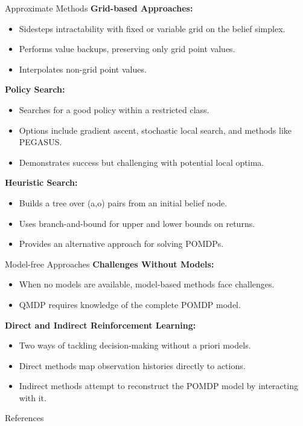 \documentclass[presentation, smaller]{beamer}
\begin{document}
\begin{frame}{Approximate Methods}
  \textbf{Grid-based Approaches:}
  \begin{itemize}
    \item Sidesteps intractability with fixed or variable grid on the belief simplex.
    \item Performs value backups, preserving only grid point values.
    \item Interpolates non-grid point values.
  \end{itemize}

  \textbf{Policy Search:}
  \begin{itemize}
    \item Searches for a good policy within a restricted class.
    \item Options include gradient ascent, stochastic local search, and methods like PEGASUS.
    \item Demonstrates success but challenging with potential local optima.
  \end{itemize}

  \textbf{Heuristic Search:}
  \begin{itemize}
    \item Builds a tree over (a,o) pairs from an initial belief node.
    \item Uses branch-and-bound for upper and lower bounds on returns.
    \item Provides an alternative approach for solving POMDPs.
  \end{itemize}
\end{frame}



\begin{frame}{Model-free Approaches}
  \textbf{Challenges Without Models:}
  \begin{itemize}
    \item When no models are available, model-based methods face challenges.
    \item QMDP requires knowledge of the complete POMDP model.
  \end{itemize}

  \textbf{Direct and Indirect Reinforcement Learning:}
  \begin{itemize}
    \item Two ways of tackling decision-making without a priori models.
    \item Direct methods map observation histories directly to actions.
    \item Indirect methods attempt to reconstruct the POMDP model by interacting with it.
  \end{itemize}
\end{frame}




\begin{frame}[label={sec:org9887ed5}]{References}
\nocite{*}


\end{frame}
\end{document}
